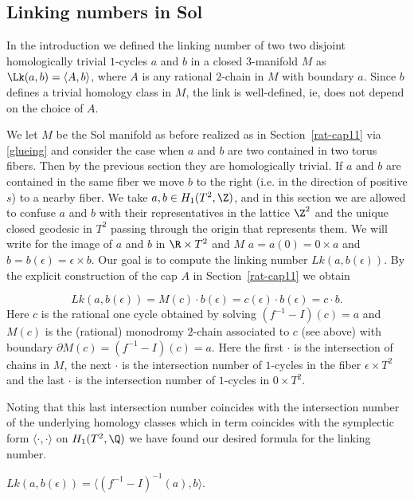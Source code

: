 \subsection{Linking numbers in Sol} \label{generaltheoryoflink}


In the introduction we defined the linking number of two two disjoint
homologically trivial $1$-cycles $a$ and $b$ in a closed $3$-manifold
$M$ as $\Lk(a,b) = \langle A,b \rangle$, where $A$ is any rational
$2$-chain in $M$ with boundary $a$. Since $b$ defines a trivial
homology class in $M$, the link is well-defined, ie, does not depend
on the choice of $A$.

We let $M$ be the Sol manifold as before realized as in
Section~\ref{rat-cap11} via \eqref{glueing} and consider the case
when $a$ and $b$ are two contained in two torus fibers. Then by the
previous section they are homologically trivial. If $a$ and $b$ are
contained in the same fiber we move $b$ to the right (i.e. in the
direction of positive $s$)  to a nearby fiber. We take $a,b \in
H_1(T^2,\Z)$, and in this section we are allowed to confuse $a$ and
$b$ with their representatives in the lattice $\Z^2$ and the unique
closed geodesic in $T^2$ passing through the origin that represents
them. We will write for the image of $a$ and $b$ in $\R \times T^2$
and $M$ $a=a(0)=0 \times a$ and $b=b(\epsilon)= \epsilon \times b$. Our
goal is to compute the linking number $Lk(a, b(\epsilon))$. By the
explicit construction of the cap $A$ in Section~\ref{rat-cap11} we
obtain

\begin{lemma}
 \[
 Lk(a,b(\epsilon)) = M(c) \cdot b(\epsilon) = c(\epsilon) \cdot b(\epsilon)= c \cdot b.
 \] 
Here $c$ is the rational one cycle obtained by solving $(f^{-1} - I) (c) =a$
and $M(c)$ is the (rational) monodromy $2$-chain associated to $c$
(see above) with boundary $\partial M(c) = (f^{-1} - I) (c) =a$.
Here the first $\cdot$ is the intersection of
chains in $M$, the next $\cdot$ is the intersection number of
$1$-cycles in the fiber $\epsilon \times T^2$ and the last $\cdot$
is the intersection number of $1$-cycles in $0 \times T^2$.
 \end{lemma}

Noting that this last intersection number coincides with the
intersection number of the underlying homology classes which in
term coincides with the symplectic form $\langle \cdot, \cdot
\rangle$ on $H_1(T^2,\Q)$ we have found our desired formula for the
linking number.
\begin{theorem}\label{linkSol}
$ Lk(a, b(\epsilon)) = \langle (f^{-1} - I)^{-1} (a), b \rangle.$
\end{theorem}

